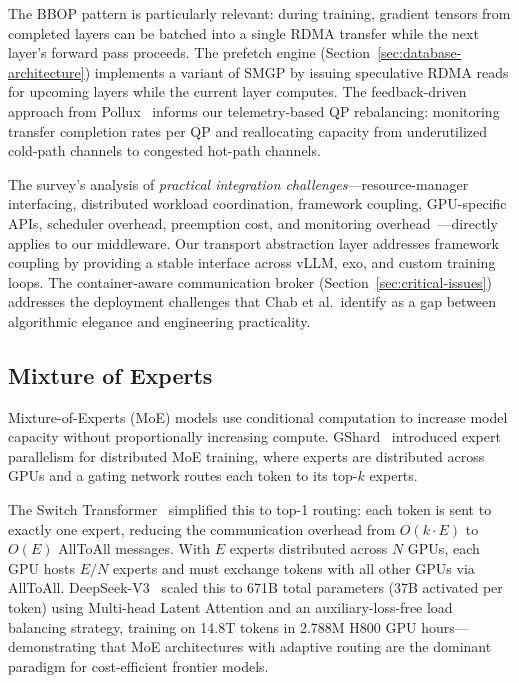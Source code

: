 \documentclass[11pt,letterpaper]{article}
\theoremstyle{definition}
\begin{document}
The BBOP pattern is particularly relevant: during training, gradient tensors from completed layers can be batched into a single RDMA transfer while the next layer's forward pass proceeds. The prefetch engine (Section~\ref{sec:database-architecture}) implements a variant of SMGP by issuing speculative RDMA reads for upcoming layers while the current layer computes. The feedback-driven approach from Pollux~\cite{pollux2021} informs our telemetry-based QP rebalancing: monitoring transfer completion rates per QP and reallocating capacity from underutilized cold-path channels to congested hot-path channels.

The survey's analysis of \emph{practical integration challenges}---resource-manager interfacing, distributed workload coordination, framework coupling, GPU-specific APIs, scheduler overhead, preemption cost, and monitoring overhead~\cite{gpu-scheduling-survey}---directly applies to our middleware. Our transport abstraction layer addresses framework coupling by providing a stable interface across vLLM, exo, and custom training loops. The container-aware communication broker (Section~\ref{sec:critical-issues}) addresses the deployment challenges that Chab et al.\ identify as a gap between algorithmic elegance and engineering practicality.

\subsection{Mixture of Experts}

Mixture-of-Experts (MoE) models use conditional computation to increase model capacity without proportionally increasing compute. GShard~\cite{lepikhin2020gshard} introduced expert parallelism for distributed MoE training, where experts are distributed across GPUs and a gating network routes each token to its top-$k$ experts.

The Switch Transformer~\cite{fedus2021switch} simplified this to top-1 routing: each token is sent to exactly one expert, reducing the communication overhead from $O(k \cdot E)$ to $O(E)$ AllToAll messages. With $E$ experts distributed across $N$ GPUs, each GPU hosts $E/N$ experts and must exchange tokens with all other GPUs via AllToAll. DeepSeek-V3~\cite{deepseekv3} scaled this to 671B total parameters (37B activated per token) using Multi-head Latent Attention and an auxiliary-loss-free load balancing strategy, training on 14.8T tokens in 2.788M H800 GPU hours---demonstrating that MoE architectures with adaptive routing are the dominant paradigm for cost-efficient frontier models.
\end{document}
